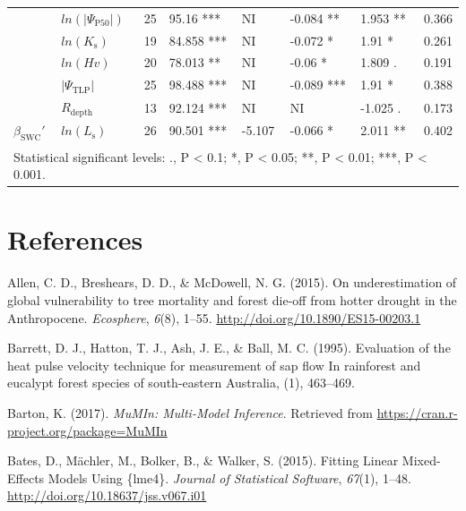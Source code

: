 \documentclass[11pt,twoside]{reedthesis}
\begin{document}
\begin{table}
{\begin{tabular}[t]{llrllllr}
\cmidrule{1-8}
 & $ln(\rvert\Psi_{\text{P50}}\rvert)$ & 25 & 95.16 *** & NI & -0.084 ** & 1.953 ** & 0.366\\
\cmidrule{2-8}
 & $ln(K_{\text{s}})$ & 19 & 84.858 *** & NI & -0.072 * & 1.91 * & 0.261\\
\cmidrule{2-8}
 & $ln(Hv)$ & 20 & 78.013 ** & NI & -0.06 * & 1.809 . & 0.191\\
\cmidrule{2-8}
 & $\rvert\Psi_{\text{TLP}}\rvert$ & 25 & 98.488 *** & NI & -0.089 *** & 1.91 * & 0.388\\
\cmidrule{2-8}
 & $R_{\text{depth}}$ & 13 & 92.124 *** & NI & NI & -1.025 . & 0.173\\
\cmidrule{2-8}
\multirow{-6}{*}{\raggedright\arraybackslash $\beta_{\text{SWC}}'$} & $ln(L_{\text{s}})$ & 26 & 90.501 *** & -5.107 & -0.066 * & 2.011 ** & 0.402\\
\bottomrule
\multicolumn{8}{l}{\textsuperscript{} Statistical significant levels: ., P < 0.1; *, P < 0.05; **, P < 0.01; ***, P < 0.001.}\\
\end{tabular}}
\end{table}
\chapter*{References}\label{references}


\noindent

\setlength{\parindent}{-0.20in} \setlength{\leftskip}{0.20in}
\setlength{\parskip}{8pt}

\hypertarget{refs}{}
\hypertarget{ref-Allen2015}{}
Allen, C. D., Breshears, D. D., \& McDowell, N. G. (2015). On
underestimation of global vulnerability to tree mortality and forest
die-off from hotter drought in the Anthropocene. \emph{Ecosphere},
\emph{6}(8), 1--55. \url{http://doi.org/10.1890/ES15-00203.1}

\hypertarget{ref-Barrett1995}{}
Barrett, D. J., Hatton, T. J., Ash, J. E., \& Ball, M. C. (1995).
Evaluation of the heat pulse velocity technique for measurement of sap
flow In rainforest and eucalypt forest species of south-eastern
Australia, (1), 463--469.

\hypertarget{ref-Barton2017}{}
Barton, K. (2017). \emph{MuMIn: Multi-Model Inference}. Retrieved from
\url{https://cran.r-project.org/package=MuMIn}

\hypertarget{ref-Bates2015}{}
Bates, D., Mächler, M., Bolker, B., \& Walker, S. (2015). Fitting Linear
Mixed-Effects Models Using \{lme4\}. \emph{Journal of Statistical
Software}, \emph{67}(1), 1--48.
\url{http://doi.org/10.18637/jss.v067.i01}
\end{document}
